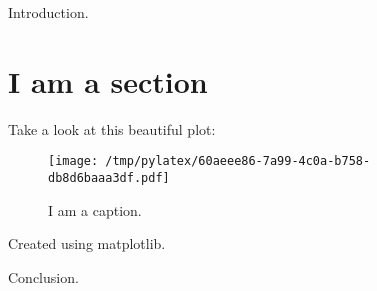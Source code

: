 \documentclass{article}%
\begin{document}
%
Introduction.%
\section*{I am a section}%
Take a look at this beautiful plot:%


\begin{figure}[htbp]%
\centering%
\texttt{[image: /tmp/pylatex/60aeee86-7a99-4c0a-b758-db8d6baaa3df.pdf]}%
\caption{I am a caption.}%
\end{figure}

%
Created using matplotlib.

%
Conclusion.%
\end{document}
